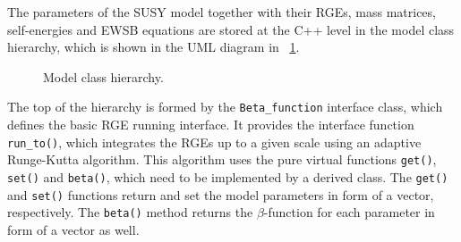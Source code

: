 \documentclass[final,3p,11pt,pdflatex]{elsarticle}
\newcommand{\code}[1]{\lstinline|#1|}  %
\newcommand{\figref}[1]{\figurename~\ref{#1}}
\begin{document}
The parameters of the SUSY model together with their RGEs, mass
matrices, self-energies and EWSB equations are stored at the C++ level
in the model class hierarchy, which is shown in the UML diagram in
\figref{fig:parameter-classes}.
%
\begin{figure}
  \centering
  \caption{Model class hierarchy.}
  \label{fig:parameter-classes}
\end{figure}

The top of the hierarchy is formed by the \code{Beta_function}
interface class, which defines the basic RGE running interface.  It
provides the interface function \code{run_to()}, which integrates the
RGEs up to a given scale using an adaptive Runge-Kutta algorithm.
This algorithm uses the pure virtual functions \code{get()},
\code{set()} and \code{beta()}, which need to be implemented by a
derived class.  The \code{get()} and \code{set()} functions return and
set the model parameters in form of a vector, respectively.  The
\code{beta()} method returns the $\beta$-function for each parameter
in form of a vector as well.
\end{document}

